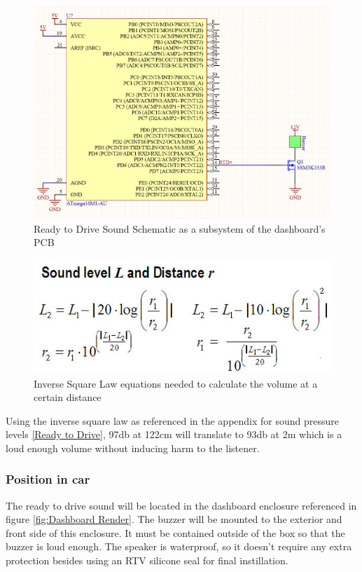 \documentclass{article}
\begin{document}
\begin{figure}[h]
	\includegraphics[width=\linewidth]{RTDS_Schematic_Simplified}
	\caption{Ready to Drive Sound Schematic as a subsystem of the dashboard's PCB}
\end{figure}
\begin{figure}[H]
	\includegraphics[width=\linewidth]{FormulasForDistanceAndSoundLevel}
	\caption{Inverse Square Law equations needed to calculate the volume at a certain distance}
\end{figure}
Using the inverse square law as referenced in the appendix  for sound pressure levels \ref{Ready to Drive}, 97db at 122cm will translate to 93db at 2m which is a loud enough volume without inducing harm to the listener. 
\subsubsection{Position in car}
The ready to drive sound will be located in the dashboard enclosure referenced in figure \ref{fig:Dashboard Render}. The buzzer will be mounted
to the exterior and front side of this enclosure. It must be contained outside of the box so that the buzzer is
loud enough. The speaker is waterproof, so it doesn't require any extra protection besides using an RTV silicone seal for final instillation. 
\end{document}
